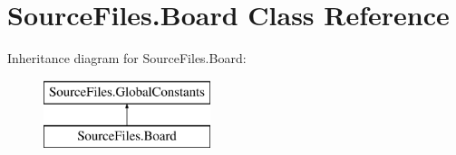 \hypertarget{class_source_files_1_1_board}{}\section{Source\+Files.\+Board Class Reference}
\label{class_source_files_1_1_board}
Inheritance diagram for Source\+Files.\+Board\+:\begin{figure}[H]
\begin{center}
\leavevmode
\includegraphics[height=2.000000cm]{class_source_files_1_1_board}
\end{center}
\end{figure}
